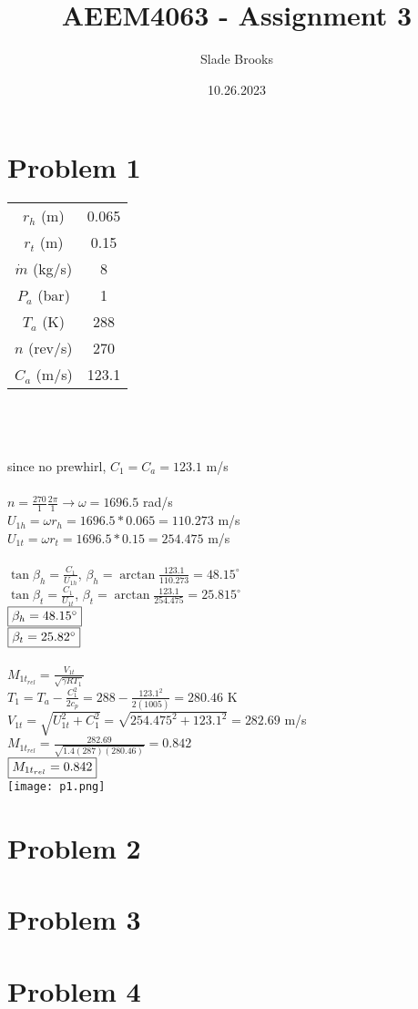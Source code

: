 \documentclass{article}
\title{AEEM4063 - Assignment 3}
\author{Slade Brooks}
\date{10.26.2023}
\begin{document}
\maketitle

\section*{Problem 1}
\begin{tabular}{cc}
    $r_h$ (m) & 0.065 \\
    $r_t$ (m) & 0.15 \\
    $\dot{m}$ (kg/s) & 8 \\
    $P_a$ (bar) & 1 \\
    $T_a$ (K) & 288 \\
    $n$ (rev/s) & 270 \\
    $C_a$ (m/s) & 123.1
\end{tabular} \\\\\\
since no prewhirl, $C_1=C_a=123.1$ m/s \\\\
$n=\frac{270}{1}\frac{2\pi}{1} \rightarrow \omega=1696.5$ rad/s \\
$U_{1h}=\omega r_h = 1696.5*0.065 = 110.273$ m/s \\
$U_{1t}=\omega r_t = 1696.5*0.15 = 254.475$ m/s \\\\
$\tan{\beta_h}=\frac{C_1}{U_{1h}}$, \quad $\beta_h=\arctan{\frac{123.1}{110.273}}
=48.15^\circ$ \\
$\tan{\beta_t}=\frac{C_1}{U_{1t}}$, \quad $\beta_t=\arctan{\frac{123.1}{254.475}}
=25.815^\circ$ \\
$\fbox{$\beta_{h}=48.15^\circ$}$ \\
$\fbox{$\beta_{t}=25.82^\circ$}$ \\\\
$M_{1t_{rel}}=\frac{V_{1t}}{\sqrt{\gamma R T_1}}$ \\
$T_1 = T_a - \frac{C_1^2}{2c_p}=288 - \frac{123.1^2}{2(1005)}=280.46$ K \\
$V_{1t}=\sqrt{U_{1t}^2 + C_1^2}=\sqrt{254.475^2 + 123.1^2}=282.69$ m/s \\
$M_{1t_{rel}}=\frac{282.69}{\sqrt{1.4(287)(280.46)}}=0.842$ \\
$\fbox{$M_{1t_{rel}}=0.842$}$ \\
\texttt{[image: p1.png]}

\section*{Problem 2}

\section*{Problem 3}

\section*{Problem 4}
\end{document}

